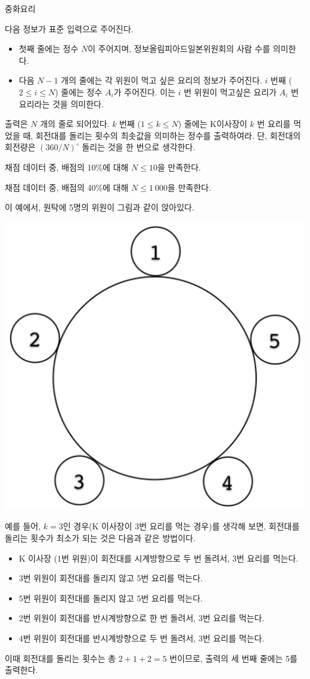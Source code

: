 \begin{problem}{중화요리}
\InputFile

다음 정보가 표준 입력으로 주어진다.

\begin{itemize}
	\item 첫째 줄에는 정수 $N$이 주어지며, 정보올림피아드일본위원회의 사람 수를 의미한다.
	\item 다음 $N-1$ 개의 줄에는 각 위원이 먹고 싶은 요리의 정보가 주어진다. $i$ 번째 ($2 \le i \le N$) 줄에는 정수 $A_i$가 주어진다. 이는 $i$ 번 위원이 먹고싶은 요리가 $A_i$ 번 요리라는 것을 의미한다.
\end{itemize}



\OutputFile

출력은 $N$ 개의 줄로 되어있다. $k$ 번째 ($1 \le k \le N$) 줄에는 K이사장이 $k$ 번 요리를 먹었을 때, 회전대를 돌리는 횟수의 최솟값을 의미하는 정수를 출력하여라. 단, 회전대의 회전량은 $(360/N)^{\circ}$ 돌리는 것을 한 번으로 생각한다.

\Scoring

채점 데이터 중, 배점의 10\%에 대해 $N \le 10$을 만족한다.

채점 데이터 중, 배점의 40\%에 대해 $N \le 1\ 000$을 만족한다.

\Examples

\begin{example}
\end{example}

이 예에서, 원탁에 5명의 위원이 그림과 같이 앉아있다.

\begin{center}
	\includegraphics[width=0.3\linewidth]{img1.png}
\end{center}

예를 들어, $k=3$인 경우(K 이사장이 3번 요리를 먹는 경우)를 생각해 보면, 회전대를 돌리는 횟수가 최소가 되는 것은 다음과 같은 방법이다.

\begin{itemize}
	\item K 이사장 (1번 위원)이 회전대를 시계방향으로 두 번 돌려서, 3번 요리를 먹는다.
	\item 3번 위원이 회전대를 돌리지 않고 5번 요리를 먹는다.
	\item 5번 위원이 회전대를 돌리지 않고 5번 요리를 먹는다.
	\item 2번 위원이 회전대를 반시계방향으로 한 번 돌려서, 3번 요리를 먹는다.
	\item 4번 위원이 회전대를 반시계방향으로 두 번 돌려서, 3번 요리를 먹는다.
\end{itemize}


이때 회전대를 돌리는 횟수는 총 $2+1+2=5$ 번이므로, 출력의 세 번째 줄에는 5를 출력한다.



\end{problem}


